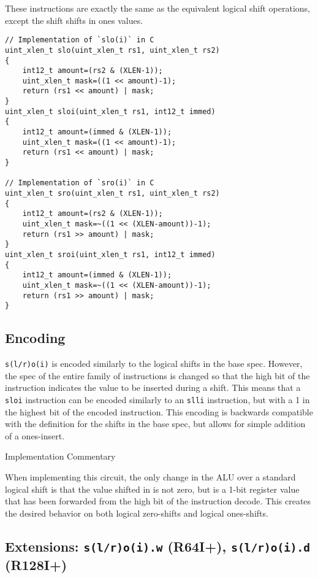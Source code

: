 These instructions are exactly the same as the equivalent logical shift
operations, except the shift shifts in ones values.

\begin{verbatim}
// Implementation of `slo(i)` in C
uint_xlen_t slo(uint_xlen_t rs1, uint_xlen_t rs2)
{
    int12_t amount=(rs2 & (XLEN-1));
    uint_xlen_t mask=((1 << amount)-1);
    return (rs1 << amount) | mask;
}
uint_xlen_t sloi(uint_xlen_t rs1, int12_t immed)
{
    int12_t amount=(immed & (XLEN-1));
    uint_xlen_t mask=((1 << amount)-1);
    return (rs1 << amount) | mask;
}

// Implementation of `sro(i)` in C
uint_xlen_t sro(uint_xlen_t rs1, uint_xlen_t rs2)
{
    int12_t amount=(rs2 & (XLEN-1));
    uint_xlen_t mask=~((1 << (XLEN-amount))-1);
    return (rs1 >> amount) | mask;
}
uint_xlen_t sroi(uint_xlen_t rs1, int12_t immed)
{
    int12_t amount=(immed & (XLEN-1));
    uint_xlen_t mask=~((1 << (XLEN-amount))-1);
    return (rs1 >> amount) | mask;
}
\end{verbatim}

\subsection{Encoding}



\texttt{s(l/r)o(i)} is encoded similarly to the logical shifts in the
base spec. However, the spec of the entire family of instructions is
changed so that the high bit of the instruction indicates the value to
be inserted during a shift. This means that a \texttt{sloi} instruction
can be encoded similarly to an \texttt{slli} instruction, but with a 1
in the highest bit of the encoded instruction. This encoding is
backwards compatible with the definition for the shifts in the base
spec, but allows for simple addition of a ones-insert.

Implementation Commentary

When implementing this circuit, the only change in the ALU over a
standard logical shift is that the value shifted in is not zero, but is
a 1-bit register value that has been forwarded from the high bit of the
instruction decode. This creates the desired behavior on both logical
zero-shifts and logical ones-shifts.

\subsection{Extensions: \texttt{s(l/r)o(i).w} (R64I+), \texttt{s(l/r)o(i).d} (R128I+)}

